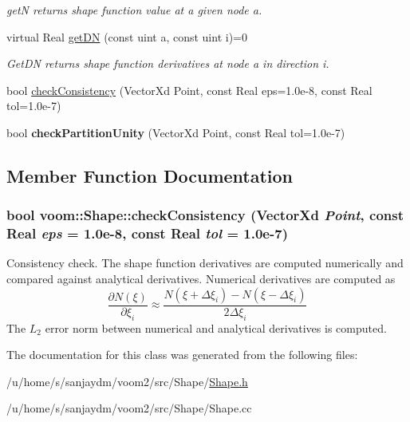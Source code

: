 \begin{DoxyCompactItemize}
\begin{DoxyCompactList}\small\item\em getN returns shape function value at a given node a. \item\end{DoxyCompactList}\item 
\hypertarget{classvoom_1_1_shape_a20d58544fca8f4c8a9360323204c2827}{
virtual Real \hyperlink{classvoom_1_1_shape_a20d58544fca8f4c8a9360323204c2827}{getDN} (const uint a, const uint i)=0}
\label{classvoom_1_1_shape_a20d58544fca8f4c8a9360323204c2827}

\begin{DoxyCompactList}\small\item\em GetDN returns shape function derivatives at node a in direction i. \item\end{DoxyCompactList}\item 
bool \hyperlink{classvoom_1_1_shape_a537587e56cf87b452bbd492261e8f504}{checkConsistency} (VectorXd Point, const Real eps=1.0e-\/8, const Real tol=1.0e-\/7)
\item 
\hypertarget{classvoom_1_1_shape_ab4fc3acfc7036908e4d87b58cf15960a}{
bool {\bfseries checkPartitionUnity} (VectorXd Point, const Real tol=1.0e-\/7)}
\label{classvoom_1_1_shape_ab4fc3acfc7036908e4d87b58cf15960a}

\end{DoxyCompactItemize}


\subsection{Member Function Documentation}
\hypertarget{classvoom_1_1_shape_a537587e56cf87b452bbd492261e8f504}{
\subsubsection[{checkConsistency}]{\setlength{\rightskip}{0pt plus 5cm}bool voom::Shape::checkConsistency (VectorXd {\em Point}, \/  const Real {\em eps} = {\ttfamily 1.0e-\/8}, \/  const Real {\em tol} = {\ttfamily 1.0e-\/7})}}
\label{classvoom_1_1_shape_a537587e56cf87b452bbd492261e8f504}
Consistency check. The shape function derivatives are computed numerically and compared against analytical derivatives. Numerical derivatives are computed as \[ \frac{\partial N(\xi)}{\partial \xi_i} \approx \frac{ N(\xi + \Delta \xi_i) - N(\xi - \Delta \xi_i) }{2\Delta \xi_i} \] The $L_2$ error norm between numerical and analytical derivatives is computed. 

The documentation for this class was generated from the following files:\begin{DoxyCompactItemize}
\item 
/u/home/s/sanjaydm/voom2/src/Shape/\hyperlink{_shape_8h}{Shape.h}\item 
/u/home/s/sanjaydm/voom2/src/Shape/Shape.cc\end{DoxyCompactItemize}
